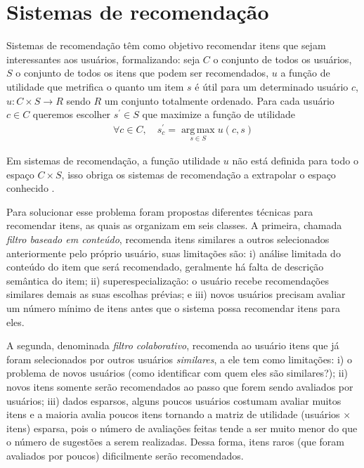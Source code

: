 \section{Sistemas de recomendação}\label{SEC_SISTEMAS_RECOMENDACAO}
Sistemas de recomendação têm como objetivo recomendar itens que sejam interessantes aos usuários, formalizando: seja \(C\) o conjunto de todos os usuários, \(S\) o conjunto de todos os itens que podem ser recomendados, \(u\) a função de utilidade que metrifica o quanto um item \(s\) é útil para um determinado usuário \(c\), \(u:C \times S\rightarrow R\) sendo \(R\) um conjunto totalmente ordenado. Para cada usuário \(c \in C \) queremos escolher \(s^{'} \in S \) que maximize a função de utilidade 
\begin{align}
\forall c \in C,  \quad s_{c}^{'} =  \operatorname*{arg\,max}_{s \in S} u(c,s) \label{formalizar_recomendacao}
\end{align}

Em sistemas de recomendação, a função utilidade \(u\) não está definida para todo o espaço \(C \times S\), isso obriga os sistemas de recomendação a extrapolar o espaço conhecido \cite{Adomavicius2005}.

Para solucionar esse problema foram propostas diferentes técnicas para recomendar itens, as quais  as organizam em seis classes. A primeira, chamada \emph{filtro baseado em conteúdo}, recomenda itens similares a outros selecionados anteriormente pelo próprio usuário, suas limitações são: i) análise limitada do conteúdo do item que será recomendado, geralmente há falta de descrição semântica do item; ii) superespecialização: o usuário recebe recomendações similares demais as suas escolhas prévias; e iii) novos usuários precisam avaliar um número mínimo de itens antes que o sistema possa recomendar itens para eles.

A segunda, denominada \emph{filtro colaborativo}, recomenda ao usuário itens que já foram selecionados por outros usuários \emph{similares}, a ele tem como limitações: i) o problema de novos usuários (como identificar com quem eles são similares?); ii) novos itens somente serão recomendados ao passo que forem sendo avaliados por usuários; iii) dados esparsos, alguns poucos usuários costumam avaliar muitos itens e a maioria avalia poucos itens tornando a matriz de utilidade (usuários \(\times\) itens) esparsa, pois o número de avaliações feitas tende a ser muito menor do que o número de sugestões a serem realizadas. Dessa forma, itens raros (que foram avaliados por poucos) dificilmente serão recomendados.

